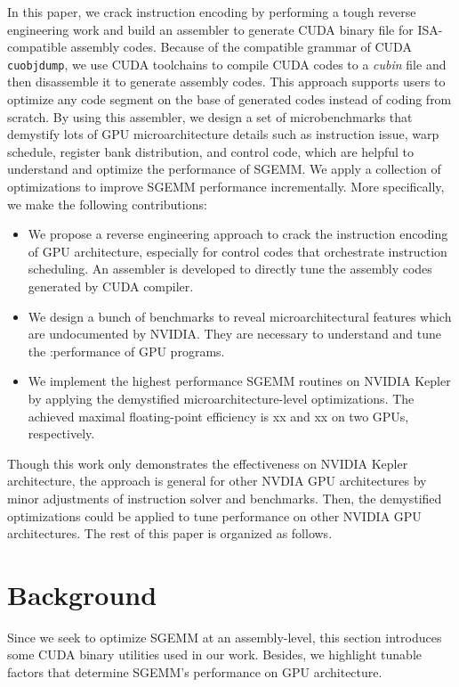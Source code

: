 \documentclass{sig-alternate-05-2015}
\begin{document}
In this paper, we crack instruction encoding by performing a tough reverse engineering work and build an assembler to generate CUDA binary file for ISA-compatible assembly codes. Because of the compatible grammar of CUDA {\tt cuobjdump}, we use CUDA toolchains to compile CUDA codes to a {\em cubin} file and then disassemble it to generate assembly codes. This approach supports users to optimize any code segment on the base of generated codes instead of coding from scratch. By using this assembler, we design a set of microbenchmarks that demystify lots of GPU microarchitecture details such as instruction issue, warp schedule, register bank distribution, and control code, which are helpful to understand and optimize the performance of SGEMM. We apply a collection of optimizations to improve SGEMM performance incrementally. More specifically, we make the following contributions:
\begin{itemize}
\item We propose a reverse engineering approach to crack the instruction encoding of GPU architecture, especially for control codes that orchestrate instruction scheduling. An assembler is developed to directly tune the assembly codes generated by CUDA compiler.
\item We design a bunch of benchmarks to reveal microarchitectural features which are undocumented by NVIDIA. They are necessary to understand and tune the :performance of GPU programs.
\item We implement the highest performance SGEMM routines on NVIDIA Kepler by applying the demystified microarchitecture-level optimizations. The achieved maximal floating-point efficiency is xx and xx on two GPUs, respectively.
\end{itemize}

Though this work only demonstrates the effectiveness on NVIDIA Kepler architecture, the approach is general for other NVDIA GPU architectures by minor adjustments of instruction solver and benchmarks. Then, the demystified optimizations could be applied to tune performance on other NVIDIA GPU architectures. The rest of this paper is organized as follows. %

\section{Background}
Since we seek to optimize SGEMM at an assembly-level, this section introduces some CUDA binary utilities used in our work. Besides, we highlight tunable factors that determine SGEMM's performance on GPU architecture.
\end{document}

